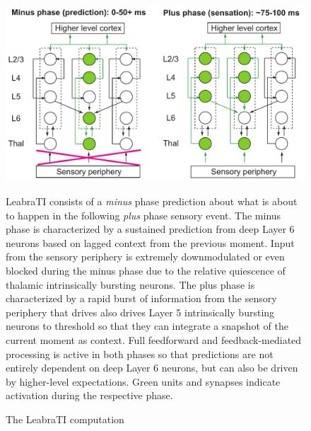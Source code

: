 \documentclass[dwyatte_dissertation.tex]{subfiles}
\begin{document}
\begin{figure}[h!]
\begin{center}
\includegraphics[width=160mm]{figs/chap_leabrati/leabrati_comp_new.pdf}
\end{center}
\caption{The LeabraTI computation}{LeabraTI consists of a \textit{minus} phase prediction about what is about to happen in the following \textit{plus} phase sensory event. The minus phase is characterized by a sustained prediction from deep Layer 6 neurons based on lagged context from the previous moment. Input from the sensory periphery is extremely downmodulated or even blocked during the minus phase due to the relative quiescence of thalamic intrinsically bursting neurons. The plus phase is characterized by a rapid burst of information from the sensory periphery that drives also drives Layer 5 intrinsically bursting neurons to threshold so that they can integrate a snapshot of the current moment as context. Full feedforward and feedback-mediated processing is active in both phases so that predictions are not entirely dependent on deep Layer 6 neurons, but can also be driven by higher-level expectations. Green units and synapses indicate activation during the respective phase.}
\label{fig:leabrati_comp}
\end{figure}
\end{document}
